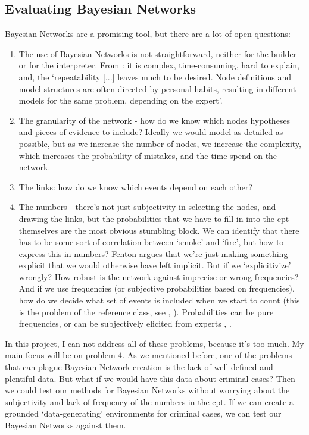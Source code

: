\subsection{Evaluating Bayesian Networks}

Bayesian Networks are a promising tool, but there are a lot of open questions:

\begin{enumerate}
\item The use of Bayesian Networks is not straightforward, neither for the builder or for the interpreter. From \citet{deKoeijer2020}: it is complex, time-consuming, hard to explain, and, the `repeatability [...] leaves much to be desired. Node definitions and model structures are often directed by personal habits, resulting in different models for the same problem, depending on the expert'.
\item The granularity of the network - how do we know which nodes hypotheses and pieces of evidence to include? Ideally we would model as detailed as possible, but as we increase the number of nodes, we increase the complexity, which increases the probability of mistakes, and the time-spend on the network.
\item The links: how do we know which events depend on each other?
\item The numbers - there's not just subjectivity in selecting the nodes, and drawing the links, but the probabilities that we have to fill in into the cpt themselves are the most obvious stumbling block. We can identify that there has to be some sort of correlation between `smoke' and `fire', but how to express this in numbers? Fenton argues that we're just making something explicit that we would otherwise have left implicit. But if we `explicitivize' wrongly? How robust is the network against imprecise or wrong frequencies? And if we use frequencies (or subjective probabilities based on frequencies), how do we decide what set of events is included when we start to count (this is the problem of the reference class, see \citep{Allan2007}, \citep{colyvan2001}). Probabilities can be pure frequencies, or can be subjectively elicited from experts \citep{renooij2001}, \citep{Druzdzel2000}.
\end{enumerate}


In this project, I can not address all of these problems, because it's too much. My main focus will be on problem 4. As we mentioned before, one of the problems that can plague Bayesian Network creation is the lack of well-defined and plentiful data. But what if we would have this data about criminal cases? Then we could test our methods for Bayesian Networks without worrying about the subjectivity and lack of frequency of the numbers in the cpt. If we can create a grounded `data-generating' environments for criminal cases, we can test our Bayesian Networks against them.

